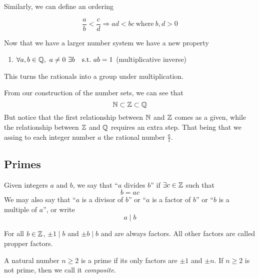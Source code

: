 \documentclass{article}
\begin{document}
Similarly, we can define an ordering
\begin{defi}
    \[
        \frac{a}{b} < \frac{c}{d} \Rightarrow ad < bc  \ \text{where} \ b, d > 0
    \]
\end{defi}

Now that we have a larger number system we have a new property
\begin{enumerate}[start=12, label=(\arabic*)]
    \item $\forall a, b \in \Q,\ a \neq 0 \ \exists b \quad \text{s.t.} \ ab = 1$ \hspace*{\fill}(multiplicative inverse)
\end{enumerate}
This turns the rationals into a group under multiplication.


\begin{remark}
    From our construction of the number sets, we can see that
    \[
        \mathbb{N} \subset \mathbb{Z} \subset \mathbb{Q}
    \]
    But notice that the first relationship between $\mathbb{N}$ and $\mathbb{Z}$ comes as a given, while the relationship between $\mathbb{Z}$ and $\mathbb{Q}$ requires an extra step. That being that we assing to each integer number $a$ the rational number $\frac{a}{1}$.
\end{remark}

\subsection{Primes}
\begin{defi}[Divides]
    Given integers $a$ and $b$, we say that ``$a$ divides $b$'' if $\exists c \in \mathbb{Z}$ such that 
    \[
        b = ac  
    \]
    We may also say that ``$a$ is a divisor of $b$'' or ``$a$ is a factor of $b$'' or ``$b$ is a multiple of $a$'', or write
    \[
        a \mid b  
    \]
 \end{defi}

 \begin{defi}
    For all $b \in \mathbb{Z}$, $\pm 1 \mid b$ and $\pm b \mid b$ and are always factors. All other factors are called propper factors.
 \end{defi}

\begin{defi}[Primes]
    A natural number $n \geq 2$ is a prime if its only factors are $\pm 1$ and $\pm n$. If $n \geq 2$ is not prime, then we call it \emph{composite}.
\end{defi}
\end{document}
